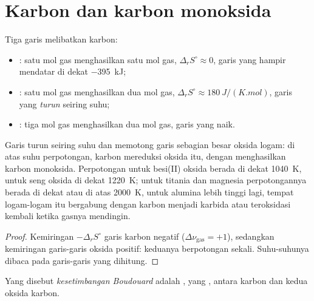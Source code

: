 \section{Karbon dan karbon monoksida}

Tiga garis melibatkan karbon:
\begin{itemize}
  \item {}: satu mol gas menghasilkan satu mol gas,
        $\Delta_r S^\circ
        \approx 0$, garis yang hampir mendatar di dekat
        \qty{-395}{kJ};
  \item {}: satu mol gas menghasilkan dua mol gas,
        $\Delta_r S^\circ
        \approx \qty{+180}{J/(K.mol)}$, garis yang
        \emph{turun} seiring suhu;
  \item {}: tiga mol gas menghasilkan dua mol gas, garis
        yang naik.
\end{itemize}

\begin{proposition}\label{prop:b2:ellingham:carbon}
Garis  turun seiring suhu dan memotong garis sebagian
besar oksida logam: di atas suhu perpotongan, karbon mereduksi oksida itu,
dengan menghasilkan karbon monoksida. Perpotongan untuk besi(II) oksida
berada di dekat \qty{1040}{K}, untuk seng oksida di dekat \qty{1220}{K};
untuk titania dan magnesia perpotongannya berada di dekat atau di atas
\qty{2000}{K}, untuk alumina lebih tinggi lagi, tempat logam-logam itu
bergabung dengan karbon menjadi karbida atau teroksidasi kembali ketika
gasnya mendingin.
\end{proposition}

\begin{proof}
Kemiringan $-\Delta_r S^\circ$ garis karbon negatif
($\Delta\nu_{\text{gas}}
= +1$), sedangkan kemiringan garis-garis oksida
positif: keduanya berpotongan sekali. Suhu-suhunya dibaca pada garis-garis
yang dihitung.
\end{proof}

\begin{definition}\label{def:b2:ellingham:boudouard}
Yang disebut \emph{kesetimbangan Boudouard}
adalah , yang , antara karbon dan
kedua oksida karbon.
\end{definition}

